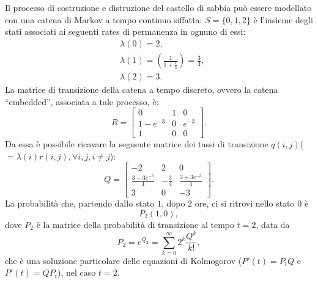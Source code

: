 \documentclass[11pt,largemargins]{homework}
\begin{document}
\section{}%
\begin{alphaparts}
    \questionpart
 Il processo di costruzione e distruzione del castello di sabbia può essere modellato con una catena di Markov a tempo continuo siffatta:                                                                        
$S=\{0,1,2\}$ è l'insieme degli stati associati ai seguenti rates di permanenza in ognuno di essi:
  \begin{align*}
  &\lambda\left(0\right)=2,\\
  &\lambda\left(1\right)=\left(\frac{1}{1+\frac{1}{3}}\right)=\frac{3}{4},\\
  &\lambda\left(2\right)=3.
  \end{align*}
 La matrice di transizione della catena a tempo discreto, ovvero la catena ``embedded'', associata a tale processo, è:
 \begin{equation*}
  R=\begin{bmatrix}
        0 & 1 & 0\\
        1-e^{-3} & 0 & e^{-3} \\
         1 & 0 & 0
      \end{bmatrix}.
\end{equation*}  
Da essa è possibile ricavare la seguente matrice dei tassi di transizione $q\left(i,j\right)$($=\lambda\left(i\right)r\left(i,j\right),\forall i,j, i\neq j$):
\begin{equation*}
  Q=\begin{bmatrix}
        -2 & 2 & 0\\
        \frac{3-3e^{-3}}{4} & -\frac{3}{4} &  \frac{3+3e^{-3}}{4}\\
         3 & 0 & -3
      \end{bmatrix}.
\end{equation*}  
\questionpart
La probabilità che, partendo dallo stato $1$, dopo $2$ ore, ci si ritrovi nello stato $0$ è
\begin{equation*}
P_{2}\left(1,0\right),
\end{equation*} 
dove $P_{2}$ è la matrice della probabilità di transizione al tempo $t= 2$, data da
\begin{equation*}
P_{2}=e^{Q_{2}}= \sum_{k=0}^{\infty}2^{k}\frac{Q^{k}}{k!},
\end{equation*}
che è una soluzione particolare delle equazioni di Kolmogorov ($P'\left(t\right)=P_{t}Q$ e $P'\left(t\right)=QP_{t}$), nel caso $t=2$.


\end{alphaparts}
\end{document}

